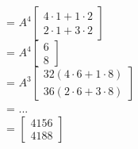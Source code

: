 \documentclass[12pt]{article}
\begin{document}
\begin{flushleft}
\begin{itemize}
              = $A^{4} \begin{bmatrix}
                      4 \cdot 1 + 1 \cdot 2 \\
                      2 \cdot 1 + 3 \cdot 2
                  \end{bmatrix}$ \\
              =  $A^{4} \begin{bmatrix}
                      6 \\
                      8
                  \end{bmatrix}$ \\
              = $A^{3} \begin{bmatrix}
                      32  (4 \cdot 6 + 1 \cdot 8) \\
                      36  (2 \cdot 6 + 3 \cdot 8)
                  \end{bmatrix} $ \\
              = ... \\
              =  $\begin{bmatrix}
                      4156 \\
                      4188
                  \end{bmatrix}$ \\



\end{itemize}
\end{flushleft}
\end{document}
